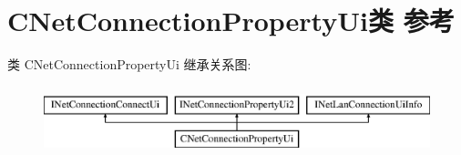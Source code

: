 \hypertarget{class_c_net_connection_property_ui}{}\section{C\+Net\+Connection\+Property\+Ui类 参考}
\label{class_c_net_connection_property_ui}
类 C\+Net\+Connection\+Property\+Ui 继承关系图\+:\begin{figure}[H]
\begin{center}
\leavevmode
\includegraphics[height=2.000000cm]{class_c_net_connection_property_ui}
\end{center}
\end{figure}
